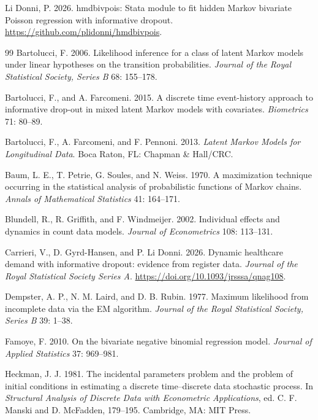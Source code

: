 \documentclass[11pt,a4paper]{article}
\begin{document}
\smallskip
\noindent Li Donni, P. 2026. hmdbivpois: Stata module to fit hidden Markov bivariate Poisson regression
with informative dropout. \url{https://github.com/plidonni/hmdbivpois}.

\begin{thebibliography}{99}
Bartolucci, F. 2006. Likelihood inference for a class of latent Markov models under linear hypotheses on
the transition probabilities. \textit{Journal of the Royal Statistical Society, Series B} 68: 155--178.

Bartolucci, F., and A. Farcomeni. 2015. A discrete time event-history approach to informative drop-out in
mixed latent Markov models with covariates. \textit{Biometrics} 71: 80--89.

Bartolucci, F., A. Farcomeni, and F. Pennoni. 2013. \textit{Latent Markov Models for Longitudinal Data}.
Boca Raton, FL: Chapman \& Hall/CRC.

Baum, L. E., T. Petrie, G. Soules, and N. Weiss. 1970. A maximization technique occurring in the
statistical analysis of probabilistic functions of Markov chains. \textit{Annals of Mathematical
Statistics} 41: 164--171.

Blundell, R., R. Griffith, and F. Windmeijer. 2002. Individual effects and dynamics in count data
models. \textit{Journal of Econometrics} 108: 113--131.

Carrieri, V., D. Gyrd-Hansen, and P. Li Donni. 2026. Dynamic healthcare demand with informative dropout:
evidence from register data. \textit{Journal of the Royal Statistical Society Series A}.
\url{https://doi.org/10.1093/jrsssa/qnag108}.

Dempster, A. P., N. M. Laird, and D. B. Rubin. 1977. Maximum likelihood from incomplete data via the EM
algorithm. \textit{Journal of the Royal Statistical Society, Series B} 39: 1--38.

Famoye, F. 2010. On the bivariate negative binomial regression model. \textit{Journal of Applied
Statistics} 37: 969--981.

Heckman, J. J. 1981. The incidental parameters problem and the problem of initial conditions in
estimating a discrete time--discrete data stochastic process. In \textit{Structural Analysis of
Discrete Data with Econometric Applications}, ed. C. F. Manski and D. McFadden, 179--195. Cambridge, MA:
MIT Press.


\end{thebibliography}
\end{document}
